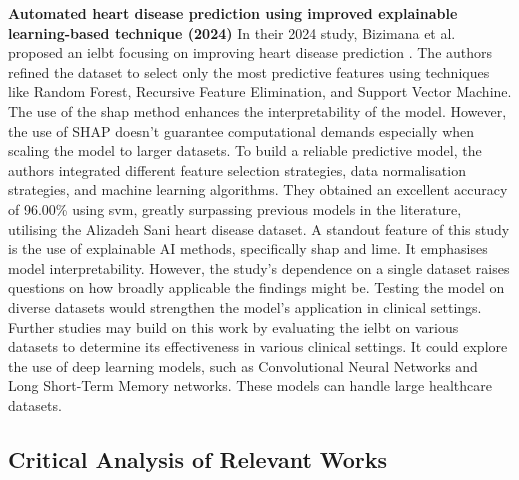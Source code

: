 \noindent
\textbf{Automated heart disease prediction using improved explainable learning-based technique (2024)}
In their 2024 study, Bizimana et al. proposed an \gls{ielbt} focusing on improving heart disease prediction \citep{bizimana2024automated}. The authors refined the dataset to select only the most predictive features using techniques like Random Forest, Recursive Feature Elimination, and Support Vector Machine. The use of the \gls{shap} method enhances the interpretability of the model. However, the use of SHAP doesn’t guarantee computational demands especially when scaling the model to larger datasets. To build a reliable predictive model, the authors integrated different feature selection strategies, data normalisation strategies, and machine learning algorithms. They obtained an excellent accuracy of 96.00\% using \gls{svm}, greatly surpassing previous models in the literature, utilising the Alizadeh Sani heart disease dataset. 
A standout feature of this study is the use of explainable AI methods, specifically \gls{shap} and \gls{lime}. It emphasises model interpretability. However, the study's dependence on a single dataset raises questions on how broadly applicable the findings might be. Testing the model on diverse datasets would strengthen the model's application in clinical settings. Further studies may build on this work by evaluating the \gls{ielbt} on various datasets to determine its effectiveness in various clinical settings. It could explore the use of deep learning models, such as Convolutional Neural Networks and Long Short-Term Memory networks. These models can handle large healthcare datasets.
\vspace{0.2 cm}
\subsection{Critical Analysis of Relevant Works}


